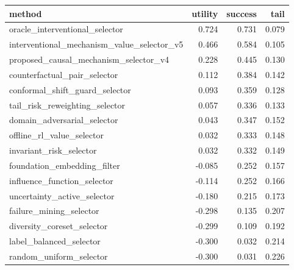 \begin{tabular}{lrrr}
\toprule
method & utility & success & tail \\
\midrule
oracle\_interventional\_selector & 0.724 & 0.731 & 0.079 \\
interventional\_mechanism\_value\_selector\_v5 & 0.466 & 0.584 & 0.105 \\
proposed\_causal\_mechanism\_selector\_v4 & 0.228 & 0.445 & 0.130 \\
counterfactual\_pair\_selector & 0.112 & 0.384 & 0.142 \\
conformal\_shift\_guard\_selector & 0.093 & 0.359 & 0.128 \\
tail\_risk\_reweighting\_selector & 0.057 & 0.336 & 0.133 \\
domain\_adversarial\_selector & 0.043 & 0.347 & 0.152 \\
offline\_rl\_value\_selector & 0.032 & 0.333 & 0.148 \\
invariant\_risk\_selector & 0.032 & 0.332 & 0.149 \\
foundation\_embedding\_filter & -0.085 & 0.252 & 0.157 \\
influence\_function\_selector & -0.114 & 0.252 & 0.166 \\
uncertainty\_active\_selector & -0.180 & 0.215 & 0.173 \\
failure\_mining\_selector & -0.298 & 0.135 & 0.207 \\
diversity\_coreset\_selector & -0.299 & 0.109 & 0.192 \\
label\_balanced\_selector & -0.300 & 0.032 & 0.214 \\
random\_uniform\_selector & -0.300 & 0.031 & 0.226 \\
\bottomrule
\end{tabular}
